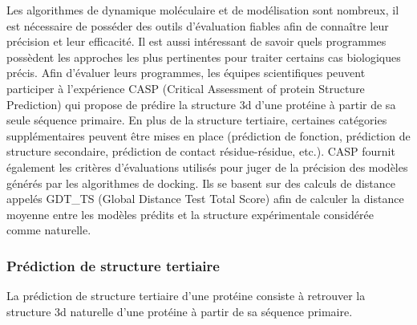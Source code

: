 Les algorithmes de dynamique moléculaire et de modélisation sont nombreux, il est nécessaire de posséder des outils d'évaluation fiables afin de connaître leur précision et leur efficacité. Il est aussi intéressant de savoir quels programmes possèdent les approches les plus pertinentes pour traiter certains cas biologiques précis. Afin d'évaluer leurs programmes, les équipes scientifiques peuvent participer à l'expérience CASP (Critical Assessment of protein Structure Prediction) qui propose de prédire la structure 3d d'une protéine à partir de sa seule séquence primaire. En plus de la structure tertiaire, certaines catégories supplémentaires peuvent être mises en place (prédiction de fonction, prédiction de structure secondaire, prédiction de contact résidue-résidue, etc.). CASP fournit également les critères d'évaluations utilisés pour juger de la précision des modèles générés par les algorithmes de docking. Ils se basent sur des calculs de distance appelés GDT\_TS (Global Distance Test Total Score) afin de calculer la distance moyenne entre les modèles prédits et la structure expérimentale considérée comme naturelle. 




\subsubsection{Prédiction de structure tertiaire} 

La prédiction de structure tertiaire d'une protéine consiste à retrouver la structure 3d naturelle d'une protéine à partir de sa séquence primaire. 

